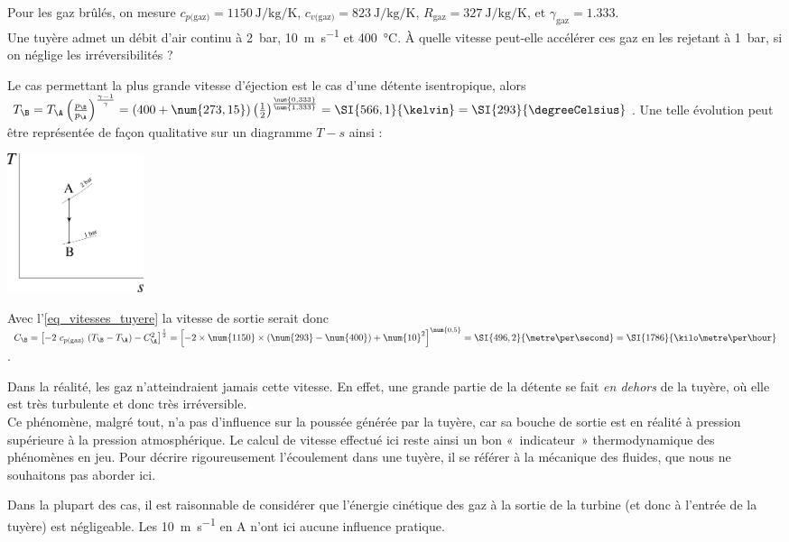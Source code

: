 		\begin{anexample}
		\label{exemple_tuyere}
			Pour les gaz brûlés, on mesure $c_{p\text{(gaz)}} = \SI{1150}{\joule\per\kilogram\per\kelvin}$, $c_{v\text{(gaz)}} = \SI{823}{\joule\per\kilogram\per\kelvin}$, $R_\text{gaz} = \SI{327}{\joule\per\kilogram\per\kelvin}$, et $\gamma_\text{gaz} = \num{1,333}$.\\
			Une tuyère admet un débit d’air continu à \SI{2}{\bar}, \SI{10}{\metre\per\second} et \SI{400}{\degreeCelsius}. À quelle vitesse peut-elle accélérer ces gaz en les rejetant à \SI{1}{\bar}, si on néglige les irréversibilités ?
				\begin{answer}
					Le cas permettant la plus grande vitesse d’éjection est le cas d’une détente isentropique, alors 
					$T_\B = T_\A \left(\frac{p_\B}{p_\A}\right)^{\frac{\gamma - 1}{\gamma}}
					 			= (400 + \num{273,15}) \left(\frac{1}{2}\right)^{\frac{\num{0,333}}{\num{1,333}}}
					 			= \SI{566,1}{\kelvin} = \SI{293}{\degreeCelsius}$.
					Une telle évolution peut être représentée de façon qualitative sur un diagramme $T-s$ ainsi :
						\begin{center}\includegraphics[width=4cm]{images/exe_ts_tuyere.png}\end{center}
					Avec l’\cref{eq_vitesses_tuyere} la vitesse de sortie serait donc 
					$C_\B = \left[ - 2 \ c_{p \text{(gaz)}} \ (T_\B - T_\A) - C_\A^2 \right]^{\frac{1}{2}}
							= \left[ - 2 \times \num{1150} \times (\num{293} - \num{400}) + \num{10}^2 \right]^{\num{0,5}}
							= \SI{496,2}{\metre\per\second} = \SI{1786}{\kilo\metre\per\hour}$.
								\begin{remark}
									Dans la réalité, les gaz n’atteindraient jamais cette vitesse. En effet, une grande partie de la détente se fait \emph{en dehors} de la tuyère, où elle est très turbulente et donc très irréversible.\\
									Ce phénomène, malgré tout, n’a pas d’influence sur la poussée générée par la tuyère, car sa bouche de sortie est en réalité à pression supérieure à la pression atmosphérique. Le calcul de vitesse effectué ici reste ainsi un bon «~indicateur~» thermodynamique des phénomènes en jeu. Pour décrire rigoureusement l’écoulement dans une tuyère, il se référer à la mécanique des fluides, que nous ne souhaitons pas aborder ici.
								\end{remark}
								\begin{remark}
									Dans la plupart des cas, il est raisonnable de considérer que l’énergie cinétique des gaz à la sortie de la turbine (et donc à l’entrée de la tuyère) est négligeable. Les \SI{10}{\metre\per\second} en A n’ont ici aucune influence pratique.
								\end{remark}
				\end{answer}
		\end{anexample}

